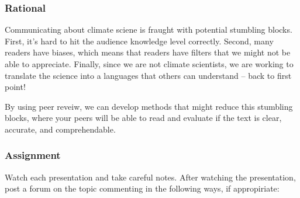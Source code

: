 
\subsubsection{Rational}

Communicating about climate sciene is fraught with potential stumbling blocks. First, it's hard to hit the audience knowledge level correctly. Second, many readers have biases, which means that readers have filters that we might not be able to appreciate. Finally, since we are not climate scientists, we are working to translate the science into a languages that others can understand -- back to first point!  

By using peer reveiw, we can develop methods that might reduce this stumbling blocks, where your peers will be able to read and evaluate if the text is clear, accurate, and comprehendable. 

\subsubsection{Assignment}

Watch each presentation and take careful notes. After watching the presentation, post a forum on the topic commenting in the following ways, if appropiriate:


